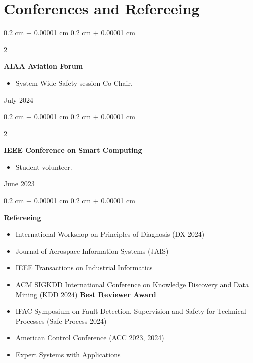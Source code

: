 \documentclass[10pt, letterpaper]{article}
\newenvironment{highlights}{
    \begin{itemize}[
        topsep=0.10 cm,
        parsep=0.10 cm,
        partopsep=0pt,
        itemsep=0pt,
        leftmargin=0.4 cm + 10pt
    ]
}{
    \end{itemize}
} %
\newenvironment{onecolentry}{
    \begin{adjustwidth}{
        0.2 cm + 0.00001 cm
    }{
        0.2 cm + 0.00001 cm
    }
}{
    \end{adjustwidth}
} %
\newenvironment{twocolentry}[2][]{
    \onecolentry
    \def\secondColumn{#2}
    \setcolumnwidth{\fill, 4.5 cm}
    \begin{paracol}{2}
}{
    \switchcolumn \raggedleft \secondColumn
    \end{paracol}
    \endonecolentry
} %
\begin{document}
    
    \section{Conferences and Refereeing}



        
        \begin{twocolentry}{
            July 2024
        }
            \textbf{AIAA Aviation Forum}
            \begin{highlights}
                \item System-Wide Safety session Co-Chair.
            \end{highlights}
        \end{twocolentry}


        \vspace{0.2 cm}

        \begin{twocolentry}{
            June 2023
        }
            \textbf{IEEE Conference on Smart Computing}
            \begin{highlights}
                \item Student volunteer.
            \end{highlights}
        \end{twocolentry}


        \vspace{0.2 cm}

        \begin{onecolentry}
            \textbf{Refereeing}
            \begin{highlights}
                \item International Workshop on Principles of Diagnosis (DX 2024)
                \item Journal of Aerospace Information Systems (JAIS)
                \item IEEE Transactions on Industrial Informatics
                \item ACM SIGKDD International Conference on Knowledge Discovery and Data Mining (KDD 2024) \textbf{Best Reviewer Award}
                \item IFAC Symposium on Fault Detection, Supervision and Safety for Technical Processes (Safe Process 2024)
                \item American Control Conference (ACC 2023, 2024)
                \item Expert Systems with Applications
            \end{highlights}
        \end{onecolentry}



    
\end{document}
